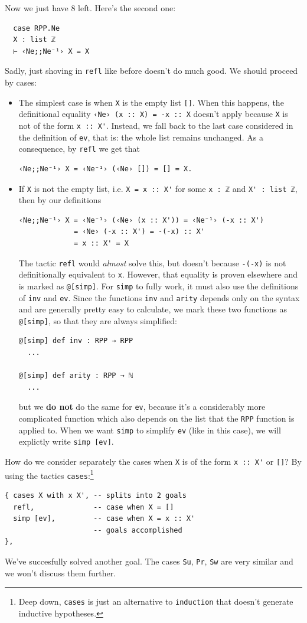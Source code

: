 \documentclass[oneside]{book}
\theoremstyle{definition}
\theoremstyle{remark}
\theoremstyle{plain}
\begin{document}
Now we just have 8 left.
Here's the second one:
\begin{lstlisting}
  case RPP.Ne
  X : list ℤ
  ⊢ ‹Ne;;Ne⁻¹› X = X
\end{lstlisting}
Sadly, just shoving in \lstinline{refl} like before doesn't do much good.
We should proceed by cases:
\begin{itemize}
\item The simplest case is when \lstinline{X} is the empty list \lstinline{[]}.
When this happens, the definitional equality \lstinline{‹Ne› (x :: X) = -x :: X} doesn't apply because \lstinline{X} is not of the form \lstinline{x :: X'}.
Instead, we fall back to the last case considered in the definition of \lstinline{ev}, that is: the whole list remains unchanged.
As a consequence, by \lstinline{refl} we get that
\begin{lstlisting}
‹Ne;;Ne⁻¹› X = ‹Ne⁻¹› (‹Ne› []) = [] = X.
\end{lstlisting}

\item If \lstinline{X} is not the empty list, i.e. \lstinline{X = x :: X'} for some \lstinline{x : ℤ} and \lstinline{X' : list ℤ},
then by our definitions
\begin{lstlisting}
‹Ne;;Ne⁻¹› X = ‹Ne⁻¹› (‹Ne› (x :: X')) = ‹Ne⁻¹› (-x :: X')
             = ‹Ne› (-x :: X') = -(-x) :: X'
             = x :: X' = X
\end{lstlisting}
The tactic \lstinline{refl} would \textit{almost} solve this,
but doesn't because \lstinline{-(-x)} is not definitionally equivalent to \lstinline{x}.
However, that equality is proven elsewhere and is marked as \lstinline{@[simp]}.
For \lstinline{simp} to fully work, it must also use the definitions of \lstinline{inv} and \lstinline{ev}.
Since the functions \lstinline{inv} and \lstinline{arity} depends only on the syntax and are generally pretty easy to calculate,
we mark these two functions as \lstinline{@[simp]}, so that they are always simplified:
\begin{lstlisting}
@[simp] def inv : RPP → RPP
  ...

@[simp] def arity : RPP → ℕ
  ...
\end{lstlisting}
but we \textbf{do not} do the same for \lstinline{ev}, because it's a considerably more complicated function
which also depends on the list that the \lstinline{RPP} function is applied to.
When we want \lstinline{simp} to simplify \lstinline{ev} (like in this case), we will explictly write \lstinline{simp [ev]}.
\end{itemize}
How do we consider separately the cases when \lstinline{X} is of the form \lstinline{x :: X'} or \lstinline{[]}?
By using the tactics
\lstinline{cases}:\footnote{Deep down, \lstinline{cases} is just an alternative to \lstinline{induction} that doesn't generate inductive hypotheses.}
\begin{lstlisting}
{ cases X with x X', -- splits into 2 goals
  refl,              -- case when X = []
  simp [ev],         -- case when X = x :: X'
                     -- goals accomplished
},
\end{lstlisting}
We've succesfully solved another goal.
The cases \lstinline{Su}, \lstinline{Pr}, \lstinline{Sw} are very similar and we won't discuss them further.
\end{document}
